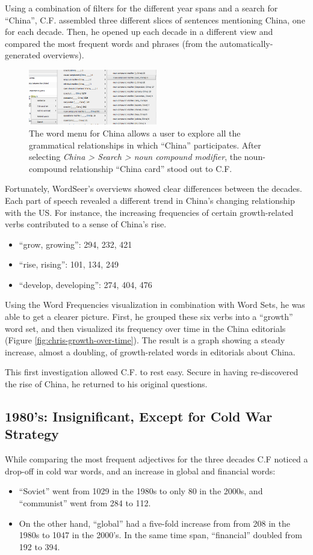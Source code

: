 \documentclass{sig-alternate}
\begin{document}
Using a combination of filters for the different year spans and a search for ``China'', C.F. assembled three different slices of sentences mentioning China, one for each decade. Then, he opened up each decade in a different view and compared the most frequent words and phrases (from the automatically-generated overviews).

\begin{figure}[h!]
\includegraphics[width=0.5\textwidth]{fig/chris/01.png}
\caption{The word menu for China allows a user to explore all the grammatical relationships in which ``China'' participates.   After selecting \emph{China > Search > noun compound modifier}, the noun-compound relationship ``China card'' stood out to C.F. \label{fig:chris01}}
\end{figure}

Fortunately, WordSeer's overviews showed clear differences between the decades. Each part of speech revealed a different trend in China's changing relationship with the US. 
For instance, the increasing  frequencies of certain growth-related verbs contributed to a sense of China's rise.
\begin{itemize}
\item ``grow, growing'':  294, 232, 421
\item ``rise, rising'': 101, 134, 249
\item ``develop, developing'': 274, 404, 476
\end{itemize}
Using the Word Frequencies visualization in combination with Word Sets, he was able to get a clearer picture. First, he grouped these six verbs into a ``growth'' word set, and then visualized its frequency over time in the China editorials (Figure \ref{fig:chris-growth-over-time}).  The result is a graph showing a steady increase, almost a doubling, of growth-related words in editorials about China.

This first investigation allowed C.F. to rest easy. Secure in having re-discovered the rise of China, he returned to his original questions.

\subsection{1980's: Insignificant, Except for Cold War Strategy}
While comparing the most frequent adjectives for the three decades C.F noticed a drop-off in cold war words, and an increase in global and financial words:
\begin{itemize}
\item ``Soviet''  went from 1029 in the 1980s to only 80 in the 2000s, and ``communist'' went from 284 to 112.  
\item On the other hand,  ``global'' had a five-fold increase from from 208 in the 1980s to 1047 in the 2000's. In the same time span,  ``financial'' doubled from 192 to 394.
\end{itemize}
\end{document}
